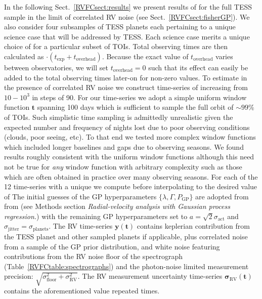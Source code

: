 In the following Sect.~\ref{RVFCsect:results} we present results of \nrv{} for the full TESS sample in the
limit of correlated RV noise (see Sect.~\ref{RVFCsect:fisherGP}). We also consider four subsamples of TESS
planets each pertaining to a unique science case that will be
addressed by TESS. Each science case merits a unique choice of \sigK{} for a
particular subset of TOIs. Total observing times are then calculated as 
\nrv{}$\cdot (t_{\text{exp}}+t_{\text{overhead}})$. Because the exact value of $t_{\text{overhead}}$ varies
between observatories, we will set $t_{\text{overhead}}=0$ such that its effect can easily
be added to the total observing times later-on for non-zero values. To estimate \nrv{} in the presence
of correlated RV noise we construct time-series of increasing \nrv{} from $10-10^3$ in steps of 90.
For our time-series we adopt a simple uniform window function $\mathbf{t}$ spanning 100 days
which is sufficient to sample the full orbit of $\sim 99$\% of TOIs. Such simplistic
time sampling is admittedly unrealistic given the expected number and frequency of nights
lost due to poor observing conditions (clouds, poor seeing, etc). To that end we
tested more complex window functions 
which included longer baselines and gaps due to observing seasons.
We found results roughly consistent with the uniform window
functions although this need not be true for \emph{any} window function with arbitrary complexity
such as those which are often obtained in practice over many observing seasons.
For each of the 12 time-series with a unique \nrv{} we compute \sigK{} before
interpolating \nrv{(}\sigK{)} to the desired value of  The
initial guesses of the GP hyperparameters $\{\lambda, \Gamma, P_{\text{GP}} \}$ are adopted from
from \cite{dittmann17} (see Methods section \emph{Radial-velocity analysis with Gaussian process regression.})
with the remaining GP hyperparameters set to $a=\sqrt{2}\sigma_{\text{act}}$ and
$\sigma_{\text{jitter}}=\sigma_{\text{planets}}$. The RV time-series $\mathbf{y}(\mathbf{t})$
contains keplerian contribution from the
TESS planet and other sampled planets if applicable, plus correlated noise from a sample of the GP prior
distribution, and white noise featuring contributions from the RV noise floor of the spectrograph  
(Table~\ref{RVFCtable:spectrographs}) and the photon-noise limited measurement precision:
$\sqrt{\sigma_{\text{floor}}^2 + \sigma_{\text{RV}}^2}$. 
The RV measurement uncertainty time-series $\boldsymbol{\sigma}_{\text{RV}}(\mathbf{t})$
contains the aforementioned value repeated \nrv{} times.


